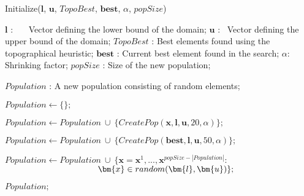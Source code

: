\begin{breakablealgorithm}
\caption{Initialize($\bm{l}$, $\bm{u}$, $TopoBest$, $\bm{best}$, $\alpha$, $popSize$)}
\label{alg:Initialize}
\begin{algorithmic}[1]


\INPUT{}
\Statex $\bm{l}$ : \ \, \, Vector defining the lower bound of the domain;
\Statex $\bm{u}$ : \quad \  Vector defining the upper bound of the domain;
\Statex $TopoBest$ : Best elements found using the topographical heuristic;
\Statex $\bm{best}$ : Current best element found in the search;
\Statex $\alpha$: \ \, \,   Shrinking factor;
\Statex $popSize$ : Size of the new population;
\Statex

\OUTPUT{}
\Statex $Population$ : A new population consisting of random elements;
\Statex
\Statex

\State $Population \gets \{\};$
\Statex



\State $Population \gets Population \ \cup \ \{CreatePop(\bm{x}, \bm{l}, \bm{u}, 20, \alpha) \};$
\EndFor
\Statex

\State $Population \gets Population \ \cup \ \{CreatePop(\bm{best}, \bm{l}, \bm{u}, 50, \alpha) \};$

\EndIf
\Statex

\State $Population \gets Population \ \cup \ \{\bm{x} = \bm{x}^1, ..., \bm{x}^{popSize-|Population|} :$
\StatexIndent[2] $\hspace{3.8cm}  \bm{x} \in random(\bm{l}, \bm{u}) \};$
\Statex

\State \Return $Population;$



\end{algorithmic}
\end{breakablealgorithm}